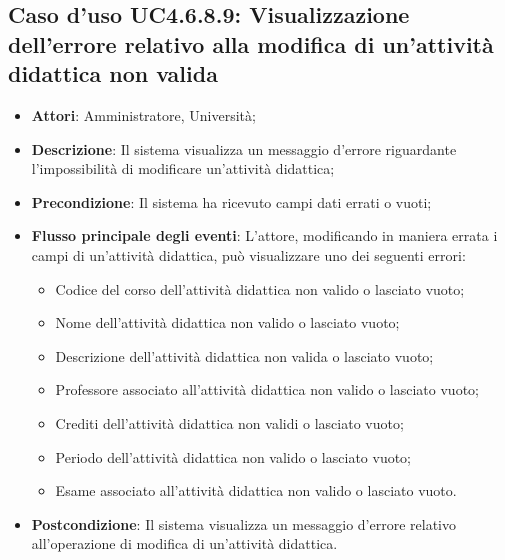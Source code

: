 \subsection{Caso d'uso \texorpdfstring{UC4.6.8.9}{UC4.6.8.9}: Visualizzazione dell'errore relativo alla modifica di un’attività didattica non valida}
\begin{itemize}
	\item \textbf{Attori}: Amministratore, Università;
	\item \textbf{Descrizione}: Il sistema visualizza un messaggio d'errore riguardante l'impossibilità di modificare un'attività didattica;
	
	\item \textbf{Precondizione}: Il sistema ha ricevuto campi dati errati o vuoti;
	
	\item \textbf{Flusso principale degli eventi}: L'attore, modificando in maniera errata i campi di un'attività didattica, può visualizzare uno dei seguenti errori: 
	\begin{itemize} 
		\item Codice del corso dell’attività didattica non valido o lasciato vuoto; 
		\item Nome dell’attività didattica non valido o lasciato vuoto;
		\item Descrizione dell’attività didattica non valida o lasciato vuoto; 
		\item Professore associato all’attività didattica non valido o lasciato vuoto;
		\item Crediti dell’attività didattica non validi o lasciato vuoto; 
		\item Periodo dell’attività didattica non valido o lasciato vuoto; 
		\item Esame associato all’attività didattica non valido o lasciato vuoto. 
	\end{itemize}
	\item \textbf{Postcondizione}: Il sistema visualizza un messaggio d'errore relativo all'operazione di modifica di un'attività didattica.
	
	
\end{itemize}
